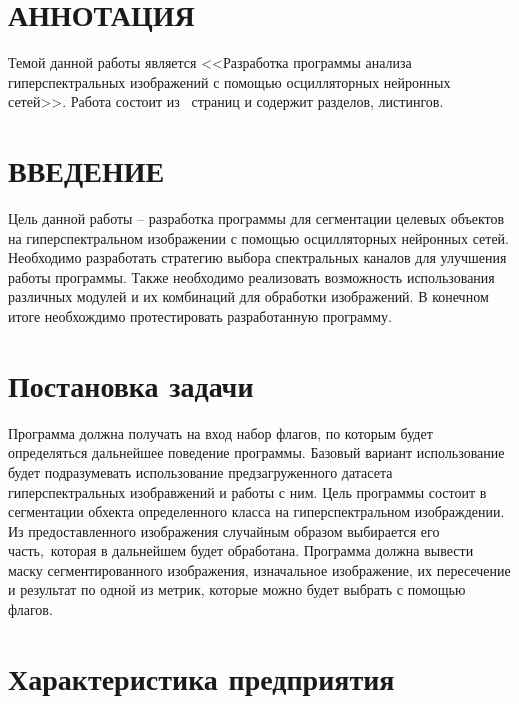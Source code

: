 \documentclass[14pt, russian]{scrartcl}
\newcommand{\anonsection}[1]{\cleardoublepage
\phantomsection
\addcontentsline{toc}{section}{\protect\numberline{}#1}
\section*{#1}\vspace*{2.5ex} %
}
\begin{document}
\section*{АННОТАЦИЯ}

Темой данной работы является <<Разработка программы анализа гиперспектральных изображений с помощью осцилляторных нейронных сетей>>. 
Работа состоит из~\pageref{TotPages} страниц и содержит \totalsections{} разделов, \totallistings{} листингов.

\newpage
\renewcommand\contentsname{\hfill{\normalfont{СОДЕРЖАНИЕ}}\hfill}  %
\tableofcontents
\newpage
\anonsection{ВВЕДЕНИЕ}  %

Цель данной работы -- разработка программы для сегментации целевых объектов на гиперспектральном изображении с помощью осцилляторных нейронных сетей. 
Необходимо разработать стратегию выбора спектральных каналов для улучшения работы программы. Также необходимо реализовать возможность использования различных модулей
и их комбинаций для обработки изображений. В конечном итоге необхождимо протестировать разработанную программу.
\newpage

\section{Постановка задачи}\label{sect:task_set}

Программа должна получать на вход набор флагов, по которым будет определяться дальнейшее поведение программы. Базовый вариант использование будет подразумевать
использование предзагруженного датасета гиперспектральных изобравжений и работы с ним. Цель программы состоит в сегментации обхекта определенного класса на 
гиперспектральном изображдении. Из предоставленного изображения случайным образом выбирается его часть,\
которая в дальнейшем будет обработана. Программа должна вывести маску сегментированного изображения, изначальное изображение, их пересечение и результат по 
одной из метрик, которые можно будет выбрать с помощью флагов. 

\section{Характеристика предприятия}
\end{document}
